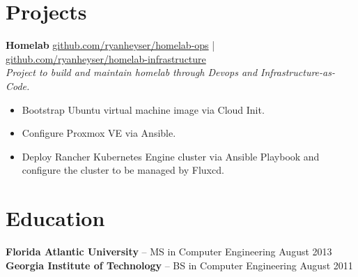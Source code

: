 \documentclass[11pt]{article}       %
\begin{document}
\vspace{-18.5pt}

\section*{Projects}
\textbf{Homelab} \hfill \href{https://github.com/ryanheyser/homelab-ops}{github.com/ryanheyser/homelab-ops} | \href{https://github.com/ryanheyser/homelab-infrastructure}{github.com/ryanheyser/homelab-infrastructure} \\
\vspace{4pt}
\textit{Project to build and maintain homelab through Devops and Infrastructure-as-Code.} \\
\vspace{-6.5pt}
\begin{itemize}
  \item Bootstrap Ubuntu virtual machine image via Cloud Init.
  \item Configure Proxmox VE via Ansible.
  \item Deploy Rancher Kubernetes Engine cluster via Ansible Playbook and configure the cluster to be managed by Fluxcd.
\end{itemize}

\vspace{-18.5pt}

\section*{Education}
\textbf{Florida Atlantic University} -- MS in Computer Engineering \hfill August 2013 \\
\textbf{Georgia Institute of Technology} -- BS in Computer Engineering \hfill August 2011
\end{document}
